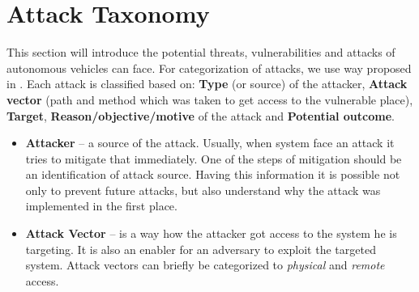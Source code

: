 \section{Attack Taxonomy}

This section will introduce the potential threats, vulnerabilities
and attacks of autonomous vehicles can face. For categorization of attacks, we use way proposed in \cite{sec}. Each attack is classified based on: \textbf{Type} (or source) of the attacker, \textbf{Attack vector} (path and method which was taken to get access to the vulnerable place), \textbf{Target}, \textbf{Reason/objective/motive} of the attack and \textbf{Potential outcome}.

\begin{itemize}
	\item \textbf{Attacker} -- a source of the attack. Usually, when system face an attack it tries to mitigate that immediately. One of the steps of mitigation should be an identification of attack source. Having this information it is possible not only to prevent future attacks, but also understand why the attack was implemented in the first place.
	\item \textbf{Attack Vector} --  is a way how the attacker got access to the system he is targeting. It is also an enabler for an adversary to exploit the targeted system. Attack vectors can briefly be categorized to \textit{physical} and \textit{remote} access.
	

\end{itemize}

